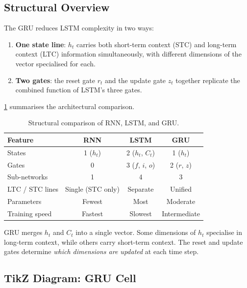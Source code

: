 \documentclass[12pt,a4paper]{article}
\begin{document}
\subsection{Structural Overview}

The GRU reduces LSTM complexity in two ways:
\begin{enumerate}
  \item \textbf{One state line}: $h_t$ carries both short-term context (STC) and long-term context
        (LTC) information simultaneously, with different dimensions of the vector specialised for each.
  \item \textbf{Two gates}: the reset gate $r_t$ and the update gate $z_t$ together replicate the
        combined function of LSTM's three gates.
\end{enumerate}

\cref{tab:rnn_comparison} summarises the architectural comparison.

\begin{table}[htbp]
\centering
\caption{Structural comparison of RNN, LSTM, and GRU.}
\label{tab:rnn_comparison}
\begin{tabular}{@{}lccc@{}}
\toprule
\textbf{Feature} & \textbf{RNN} & \textbf{LSTM} & \textbf{GRU} \\
\midrule
States & 1 ($h_t$) & 2 ($h_t$, $C_t$) & 1 ($h_t$) \\
Gates & 0 & 3 ($f$, $i$, $o$) & 2 ($r$, $z$) \\
Sub-networks & 1 & 4 & 3 \\
LTC / STC lines & Single (STC only) & Separate & Unified \\
Parameters & Fewest & Most & Moderate \\
Training speed & Fastest & Slowest & Intermediate \\
\bottomrule
\end{tabular}
\end{table}

\begin{keyinsight}[title=GRU Design Philosophy]
GRU merges $h_t$ and $C_t$ into a single vector. Some dimensions of $h_t$ specialise in
long-term context, while others carry short-term context. The reset and update gates
determine \emph{which dimensions are updated} at each time step.
\end{keyinsight}

\subsection{TikZ Diagram: GRU Cell}
\end{document}
